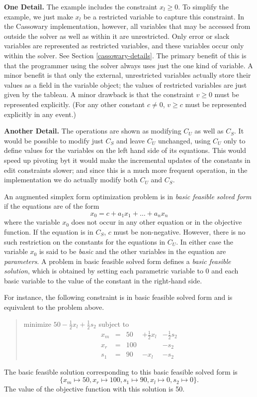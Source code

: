 \documentclass{article}
\begin{document}
{\bf One Detail.}  The example includes the constraint $x_l \geq 0$.  To
simplify the example, we just make $x_l$ be a restricted variable to
capture this constraint.  In the Cassowary implementation, however, all
variables that may be accessed from outside the solver as well as within it
are unrestricted.  Only error or slack variables are represented as
restricted variables, and these variables occur only within the solver.
See Section \ref{cassowary-details}.  The primary benefit of this is
that the programmer using the solver always uses just the one kind of
variable.  A minor benefit is that only the external, unrestricted
variables actually store their values as a field in the variable object;
the values of restricted variables are just given by the tableau.  A minor
drawback is that the constraint $v \geq 0$ must be represented explicitly.
(For any other constant $c \neq 0$, $v \geq c$ must be represented
explicitly in any event.)

{\bf Another Detail.}  The operations are shown as modifying $C_U$ as well
as $C_S$\@.  It would be possible to modify just $C_S$ and leave $C_U$
unchanged, using $C_U$ only to define values for the variables on the left
hand side of its equations.  This would speed up pivoting byt it would make the incremental updates of the constants in edit
constraints slower; and since this is a much more frequent operation, in
the implementation we do actually modify both $C_U$ and $C_S$\@.

An augmented simplex form optimization problem is in 
\emph{basic feasible solved form} if the equations are of the form 
$$x_0 = c + a_1 x_1 + \ldots + a_n x_n$$ where the variable $x_0$ does not
occur in any other equation or in the objective function.  If the equation
is in $C_S$, $c$ must be non-negative.  However, there is no
such restriction on the constants for the equations in $C_U$\@.  In either
case the variable $x_0$ is said to be \emph{basic} and the other
variables in the equation are \emph{parameters}.  A problem in basic
feasible solved form defines a \emph{basic feasible solution}, which is
obtained by setting each parametric variable to 0 and each basic variable
to the value of the constant in the right-hand side.

For instance, the following constraint
is in basic feasible solved form and is equivalent to the 
problem above.
\begin{quote}\vspace*{-1ex}
minimize $50 - \frac{1}{2} x_l + \frac{1}{2} s_2 $ 
subject to 
$$
\begin{array}{rlrrr} 
x_m & = &50 & + \frac{1}{2} x_l & - \frac{1}{2} s_2 \\
x_r & = &100 &  & - s_2 \\ \hline
s_1 & = &90 & - x_l &  - s_2 
\end{array}
$$
\end{quote}\vspace{-0.9ex}
The basic feasible solution corresponding to this
basic feasible solved form is 
$$\{x_m \mapsto 50, x_r \mapsto 100, s_1 \mapsto 90, x_l \mapsto 0, 
s_2 \mapsto 0\}.$$
The value of the objective function with this solution is 50.
\end{document}
